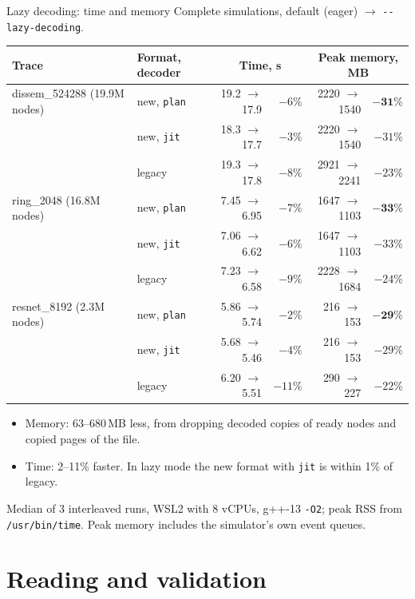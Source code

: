 \documentclass[aspectratio=169,11pt]{beamer}
\begin{document}
\begin{frame}{Lazy decoding: time and memory}
\small
Complete simulations, default (eager) $\to$ \texttt{-{}-lazy-decoding}.
\vspace{1mm}

\centering
\scriptsize
\begin{tabular}{llrrrr}
\toprule
\textbf{Trace} & \textbf{Format, decoder} & \multicolumn{2}{c}{\textbf{Time, s}} & \multicolumn{2}{c}{\textbf{Peak memory, MB}} \\
\midrule
dissem\_524288 (19.9M nodes) & new, \texttt{plan} & 19.2 $\to$ 17.9 & $-6\%$ & 2220 $\to$ 1540 & $\mathbf{-31\%}$ \\
 & new, \texttt{jit} & 18.3 $\to$ 17.7 & $-3\%$ & 2220 $\to$ 1540 & $-31\%$ \\
 & legacy & 19.3 $\to$ 17.8 & $-8\%$ & 2921 $\to$ 2241 & $-23\%$ \\
ring\_2048 (16.8M nodes) & new, \texttt{plan} & 7.45 $\to$ 6.95 & $-7\%$ & 1647 $\to$ 1103 & $\mathbf{-33\%}$ \\
 & new, \texttt{jit} & 7.06 $\to$ 6.62 & $-6\%$ & 1647 $\to$ 1103 & $-33\%$ \\
 & legacy & 7.23 $\to$ 6.58 & $-9\%$ & 2228 $\to$ 1684 & $-24\%$ \\
resnet\_8192 (2.3M nodes) & new, \texttt{plan} & 5.86 $\to$ 5.74 & $-2\%$ & 216 $\to$ 153 & $\mathbf{-29\%}$ \\
 & new, \texttt{jit} & 5.68 $\to$ 5.46 & $-4\%$ & 216 $\to$ 153 & $-29\%$ \\
 & legacy & 6.20 $\to$ 5.51 & $-11\%$ & 290 $\to$ 227 & $-22\%$ \\
\bottomrule
\end{tabular}
\par\raggedright\vspace{2mm}
\small
\begin{itemize}
\item Memory: 63--680\,MB less, from dropping decoded copies of ready nodes and copied pages of the file.
\item Time: 2--11\% faster. In lazy mode the new format with \texttt{jit} is within 1\% of legacy.
\end{itemize}
{\scriptsize\color{black!60}\par
Median of 3 interleaved runs, WSL2 with 8 vCPUs, g++-13 \texttt{-O2}; peak RSS from \texttt{/usr/bin/time}. Peak memory includes the simulator's own event queues.}
\end{frame}

\section{Reading and validation}
\end{document}
